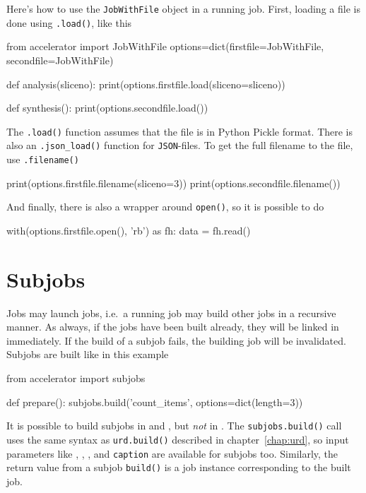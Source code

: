Here's how to use the \texttt{JobWithFile} object in a running job.
First, loading a file is done using \texttt{.load()}, like this
\begin{python}
from accelerator import JobWithFile
options=dict(firstfile=JobWithFile, secondfile=JobWithFile)

def analysis(sliceno):
    print(options.firstfile.load(sliceno=sliceno))

def synthesis():
    print(options.secondfile.load())
\end{python}
The \texttt{.load()} function assumes that the file is in Python
Pickle format.  There is also an \texttt{.json\_load()} function
for \texttt{JSON}-files.  To get the full filename to the file,
use \texttt{.filename()}
\begin{python}
    print(options.firstfile.filename(sliceno=3))
    print(options.secondfile.filename())
\end{python}
And finally, there is also a wrapper around \texttt{open()}, so it is
possible to do
\begin{python}
    with(options.firstfile.open(), 'rb') as fh:
        data = fh.read()
\end{python}
        

\section{Subjobs}
\label{sec:subjobs}
Jobs may launch jobs, i.e.\ a running job may build other jobs in a
recursive manner.  As always, if the jobs have been built already,
they will be linked in immediately.  If the build of a subjob fails,
the building job will be invalidated.  Subjobs are built like in this
example
\begin{python}
from accelerator import subjobs

def prepare():
    subjobs.build('count_items', options=dict(length=3))
\end{python}
It is possible to build subjobs in \prepare and \synthesis, but \textsl{not} in
\analysis.  The \texttt{subjobs.build()} call uses the same syntax as
\texttt{urd.build()} described in chapter~\ref{chap:urd}, so input
parameters like \options, \datasets, \jobs, and \texttt{caption} are
available for subjobs too.  Similarly, the return value from a subjob
\texttt{build()} is a job instance corresponding to the built job.

